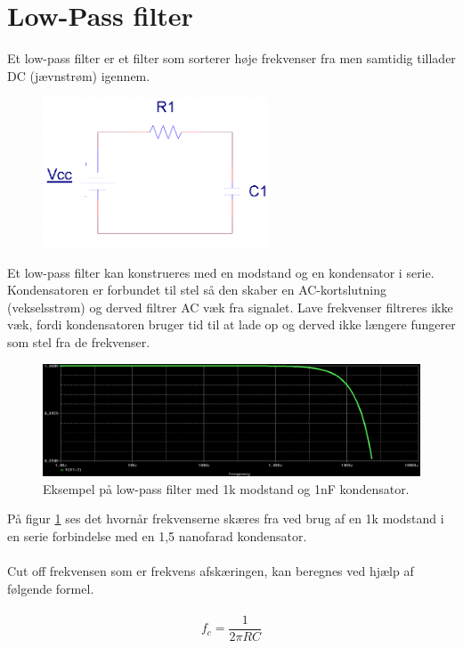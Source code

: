 \section{Low-Pass filter}
\label{lowPassFilter}

Et low-pass filter er et filter som sorterer høje frekvenser fra men samtidig tillader DC (jævnstrøm) igennem.

\begin{figure}[h!]
  \centering
  \includegraphics[width=0.6\textwidth]{figures/low_pass_schematic.png}
\end{figure}

Et low-pass filter kan konstrueres med en modstand og en kondensator i serie. Kondensatoren er forbundet til stel så den skaber en AC-kortslutning (vekselsstrøm) og derved filtrer AC væk fra signalet. 
Lave frekvenser filtreres ikke væk, fordi kondensatoren bruger tid til at lade op og derved ikke længere fungerer som stel fra de frekvenser.

\begin{figure}[h!]
  \centering
  \includegraphics[width=1.0\textwidth]{figures/low_pass_cut_off_frequency.png}
  \caption{Eksempel på low-pass filter med 1k modstand og 1nF kondensator.}
  \label{low_pass}
\end{figure}

På figur \ref{low_pass} ses det hvornår frekvenserne skæres fra ved brug af en 1k modstand i en serie forbindelse med en 1,5 nanofarad kondensator.
\\
\\ 
Cut off frekvensen som er frekvens afskæringen, kan beregnes ved hjælp af følgende formel. 
\\
\\
\begin{equation}
f_{c}=\frac{1}{2\pi R C }
\label{lowPassEquation}
\end{equation}
\\
\\
